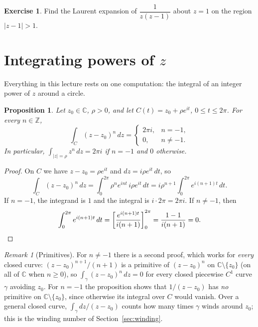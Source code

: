 \documentclass[11pt]{article}
\theoremstyle{plain}
\newtheorem{proposition}[theorem]{Proposition}
\theoremstyle{definition}
\newtheorem{exercise}[theorem]{Exercise}
\theoremstyle{remark}
\newtheorem*{remark}{Remark}
\numberwithin{equation}{section}
\newcommand{\C}{\mathbb{C}}
\newcommand{\Z}{\mathbb{Z}}
\begin{document}
\begin{exercise}
Find the Laurent expansion of $\dfrac{1}{z(z-1)}$ about $z=1$ on the
region $|z-1|>1$.
\end{exercise}

\section{Integrating powers of $z$}
Everything in this lecture rests on one computation: the integral of an
integer power of $z$ around a circle.

\begin{proposition}\label{prop:powers}
Let $z_0\in\C$, $\rho>0$, and let $C(t)=z_0+\rho e^{it}$, $0\leq t\leq2\pi$.
For every $n\in\Z$,
\begin{equation}
 \boxed{\int_C(z-z_0)^n\,dz=
 \begin{cases}2\pi i,&n=-1,\\[2pt] 0,&n\ne-1.\end{cases}}
\end{equation}
In particular, $\int_{|z|=\rho}z^n\,dz=2\pi i$ if $n=-1$ and $0$ otherwise.
\end{proposition}
\begin{proof}
On $C$ we have $z-z_0=\rho e^{it}$ and $dz=i\rho e^{it}\,dt$, so
\begin{equation}
 \int_C(z-z_0)^n\,dz=\int_0^{2\pi}\rho^ne^{int}\,i\rho e^{it}\,dt
 =i\rho^{n+1}\int_0^{2\pi}e^{i(n+1)t}\,dt.
\end{equation}
If $n=-1$, the integrand is $1$ and the integral is $i\cdot2\pi=2\pi i$. If
$n\ne-1$, then
\begin{equation}
 \int_0^{2\pi}e^{i(n+1)t}\,dt=\left[\frac{e^{i(n+1)t}}{i(n+1)}\right]_0^{2\pi}
 =\frac{1-1}{i(n+1)}=0.\qedhere
\end{equation}
\end{proof}

\begin{remark}[Primitives]
For $n\ne-1$ there is a second proof, which works for \emph{every} closed
curve: $(z-z_0)^{n+1}/(n+1)$ is a primitive of $(z-z_0)^n$ on
$\C\setminus\{z_0\}$ (on all of $\C$ when $n\geq0$), so
$\int_\gamma(z-z_0)^n\,dz=0$ for every closed piecewise $C^1$ curve $\gamma$
avoiding $z_0$. For $n=-1$ the proposition shows that $1/(z-z_0)$ has
\emph{no} primitive on $\C\setminus\{z_0\}$, since otherwise its integral
over $C$ would vanish. Over a general closed curve, $\int_\gamma dz/(z-z_0)$
counts how many times $\gamma$ winds around $z_0$; this is the winding number
of Section~\ref{sec:winding}.
\end{remark}
\end{document}
